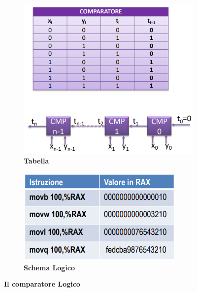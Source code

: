 \documentclass[12pt]{article}
\begin{document}
\begin{figure}[h]
    \centering
        \begin{subfigure}[b]{0.40\textwidth}
            \centering
            \includegraphics[width=\textwidth]{comparatore.png}
            \caption{\textbf{Tabella}}
            \label{fig:enter-label}
        \end{subfigure}
     \hfill %
     \begin{subfigure}[b]{0.45\textwidth}
             \centering
             \includegraphics[width=\textwidth]{image.png}
             \caption{\textbf{Schema Logico}}
             \label{fig:enter-label}
         \end{subfigure}
    \caption{\textbf{Il comparatore Logico}}
    \label{fig:main}
\end{figure}
\end{document}
